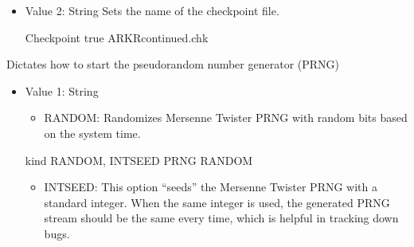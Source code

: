 \documentclass[letterpaper,10pt,english]{sphinxmanual}
\begin{document}
\begin{description}
\begin{itemize}
\item {} 
\sphinxAtStartPar
Value 2: String \sphinxhyphen{} Sets the name of the checkpoint file.

\begin{sphinxVerbatim}[commandchars=\\\{\}]
Checkpoint   true        AR\PYGZus{}KR\PYGZus{}continued.chk
\end{sphinxVerbatim}

\end{itemize}

\item[{\sphinxcode{\sphinxupquote{PRNG}}}] \leavevmode
\sphinxAtStartPar
Dictates how to start the pseudo\sphinxhyphen{}random number generator (PRNG)
\begin{itemize}
\item {} 
\sphinxAtStartPar
Value 1: String
\begin{itemize}
\item {} 
\sphinxAtStartPar
RANDOM: Randomizes Mersenne Twister PRNG with random bits based on the system time.

\end{itemize}

\begin{sphinxVerbatim}[commandchars=\\\{\}]
\PYGZsh{}\PYGZsh{}\PYGZsh{}\PYGZsh{}\PYGZsh{}\PYGZsh{}\PYGZsh{}\PYGZsh{}\PYGZsh{}\PYGZsh{}\PYGZsh{}\PYGZsh{}\PYGZsh{}\PYGZsh{}\PYGZsh{}\PYGZsh{}\PYGZsh{}\PYGZsh{}\PYGZsh{}\PYGZsh{}\PYGZsh{}\PYGZsh{}\PYGZsh{}\PYGZsh{}\PYGZsh{}\PYGZsh{}\PYGZsh{}\PYGZsh{}\PYGZsh{}\PYGZsh{}\PYGZsh{}\PYGZsh{}\PYGZsh{}
\PYGZsh{} kind \PYGZob{}RANDOM, INTSEED\PYGZcb{}
\PYGZsh{}\PYGZsh{}\PYGZsh{}\PYGZsh{}\PYGZsh{}\PYGZsh{}\PYGZsh{}\PYGZsh{}\PYGZsh{}\PYGZsh{}\PYGZsh{}\PYGZsh{}\PYGZsh{}\PYGZsh{}\PYGZsh{}\PYGZsh{}\PYGZsh{}\PYGZsh{}\PYGZsh{}\PYGZsh{}\PYGZsh{}\PYGZsh{}\PYGZsh{}\PYGZsh{}\PYGZsh{}\PYGZsh{}\PYGZsh{}\PYGZsh{}\PYGZsh{}\PYGZsh{}\PYGZsh{}\PYGZsh{}\PYGZsh{}
PRNG   RANDOM
\end{sphinxVerbatim}
\begin{itemize}
\item {} 
\sphinxAtStartPar
INTSEED: This option “seeds” the Mersenne Twister PRNG with a standard integer. When the same integer is used, the generated PRNG stream should be the same every time, which is helpful in tracking down bugs.

\end{itemize}

\end{itemize}


\end{description}
\end{document}
